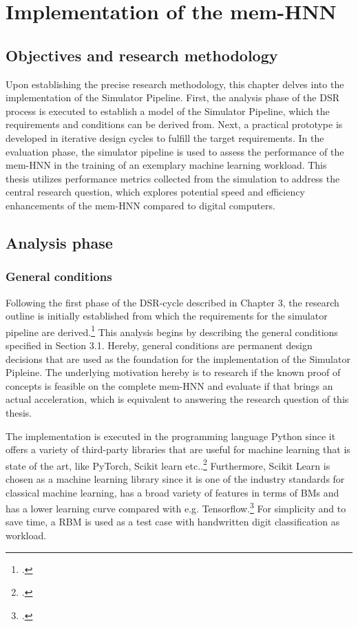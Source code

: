 \chapter{Implementation of the mem-HNN}

\section{Objectives and research methodology}
Upon establishing the precise research methodology, this chapter delves into the implementation of the Simulator Pipeline.
First, the analysis phase of the \ac{DSR} process is executed to establish a model of the Simulator Pipeline,
which the requirements and conditions can be derived from. 
Next, a practical prototype is developed in iterative design cycles to fulfill the target requirements.
In the evaluation phase, the simulator pipeline is used to assess the performance of the \ac{mem-HNN} 
in the training of an exemplary machine learning workload. 
This thesis utilizes performance metrics collected from the simulation to address the central research question, which explores potential speed and efficiency enhancements of the \ac{mem-HNN} compared to digital computers.


\section{Analysis phase}
\subsection{General conditions}

Following the first phase of the \ac{DSR}-cycle described in Chapter 3, the research outline is initially established from which the requirements for the simulator pipeline are derived.\footcite[cf.][278-279]{oesterleKonsortialforschung2010}
This analysis begins by describing the general conditions specified in Section 3.1.
Hereby, general conditions are permanent design decisions that are used as the foundation for the implementation of the Simulator Pipleine.
The underlying motivation hereby is to research if the known proof of concepts is feasible on the complete \ac{mem-HNN}
and evaluate if that brings an actual acceleration, which is equivalent to answering the research question of this thesis. 

The implementation is executed in the programming language Python since it offers a variety of third-party libraries that are useful 
for machine learning that is state of the art, like PyTorch, Scikit learn etc..\footcite[cf.][306-307]{DiscreteContinuousModels}
Furthermore, Scikit Learn is chosen as a machine learning library since it is one of the industry standards for classical machine learning, has a broad variety of features in terms of \ac{BM}s
and has a lower learning curve compared with e.g. Tensorflow.\footcite[cf.][5-6]{raschkaMachineLearningPython2020}
For simplicity and to save time, a \ac{RBM} is used as a test case with handwritten digit classification as workload.

